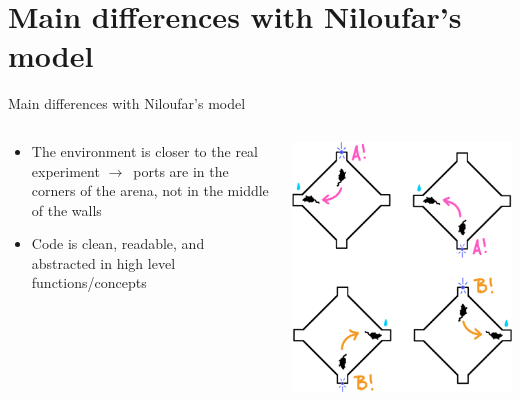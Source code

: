 \documentclass[bigger]{beamer}
\begin{document}
\section{Main differences with Niloufar's model}
\label{sec:org66c2eaa}
\begin{frame}[label={sec:orge40f702}]{Main differences with Niloufar's model}
\begin{columns}
\begin{column}{0.7\columnwidth}
\begin{itemize}
\item The environment is \alert{closer to the real experiment} \(\to\)~ports are in the corners of the arena, not in the middle of the walls
\item Code is clean, readable, and abstracted in high level functions/concepts
\end{itemize}
\end{column}
\begin{column}{0.3\columnwidth}
\begin{center}
\includegraphics[width=\textwidth]{img/task.png}
\end{center}
\begin{center}

\end{center}
\end{column}
\end{columns}
\end{frame}
\end{document}
